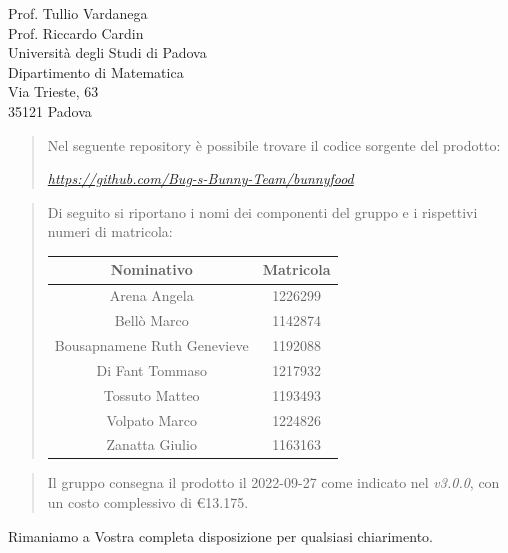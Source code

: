 \documentclass{articoletteracdp}
\begin{document}
\begin{letter}{
			Prof. Tullio Vardanega \\
			Prof. Riccardo Cardin \\
			Università degli Studi di Padova \\
			Dipartimento di Matematica \\
			Via Trieste, 63 \\
			35121 Padova
		}
		\begin{quotation}
			Nel seguente repository è possibile trovare il codice sorgente del prodotto:
			\begin{center}
				\href{https://github.com/Bug-s-Bunny-Team/bunnyfood}{\textit{https://github.com/Bug-s-Bunny-Team/bunnyfood}}
			\end{center}
		\end{quotation}
		
		\newpage

        \begin{quotation}
			\noindent
			Di seguito si riportano i nomi dei componenti del gruppo e i rispettivi numeri di matricola:

				\begin{center}
					\setlength{\extrarowheight}{.75ex}
					\begin{tabular}{ c | c }
						\textbf{Nominativo}           & \textbf{Matricola} \\
						\hline

						Arena Angela{}                & 1226299{}          \\
						Bellò Marco{}                 & 1142874{}          \\
						Bousapnamene Ruth Genevieve{} & 1192088{}          \\
						Di Fant Tommaso{}             & 1217932{}          \\
						Tossuto Matteo{}              & 1193493{}          \\
						Volpato Marco{}               & 1224826{}          \\
						Zanatta Giulio{}              & 1163163{}          \\

						\hline
					\end{tabular}
				\end{center}
			
		\end{quotation}

		\begin{quotation}
			\noindent
			Il gruppo consegna il prodotto il
			2022-09-27 come indicato nel \PdP{} \textit{v3.0.0}, con un costo
			complessivo di \euro13.175.
		\end{quotation}

		\vspace{0.5cm}
		Rimaniamo a Vostra completa disposizione per qualsiasi chiarimento.


\end{letter}
\end{document}
